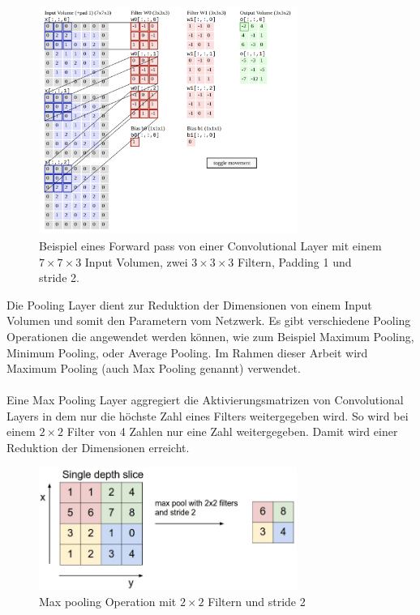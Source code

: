 \begin{figure}[H]
  \centering
  \includegraphics[width=0.75\textwidth]{resources/cnn/funktion-cnn.png}
  \caption{
    Beispiel eines Forward pass von einer Convolutional \gls{Layer} mit einem $ 7\times7\times3 $ Input Volumen, zwei $3\times3\times3$ Filtern, 
    Padding 1 und \gls{stride} 2.
    \cite{convnet-demo}
  }
  \label{image:convnet-demo}
\end{figure}

Die Pooling Layer dient zur Reduktion der Dimensionen von einem Input Volumen und somit den Parametern vom Netzwerk. Es gibt 
verschiedene Pooling Operationen die angewendet werden können, wie zum Beispiel Maximum Pooling, Minimum Pooling, oder Average Pooling. Im Rahmen 
dieser Arbeit wird Maximum Pooling (auch Max Pooling genannt) verwendet.
\\
\\
Eine Max Pooling \gls{Layer} aggregiert die Aktivierungsmatrizen von Convolutional Layers in dem nur die höchste Zahl eines Filters weitergegeben 
wird. So wird bei einem $ 2 \times 2 $ Filter von 4 Zahlen nur eine Zahl weitergegeben. Damit wird einer Reduktion der Dimensionen erreicht.

\begin{figure}[H]
  \centering
  \includegraphics[width=0.75\textwidth]{resources/cnn/pooling.png}
  \caption{
    Max pooling Operation mit $ 2 \times 2 $ Filtern und \gls{stride} 2
    \cite{convnet-demo}
  }
  \label{image:pooling}
\end{figure}

